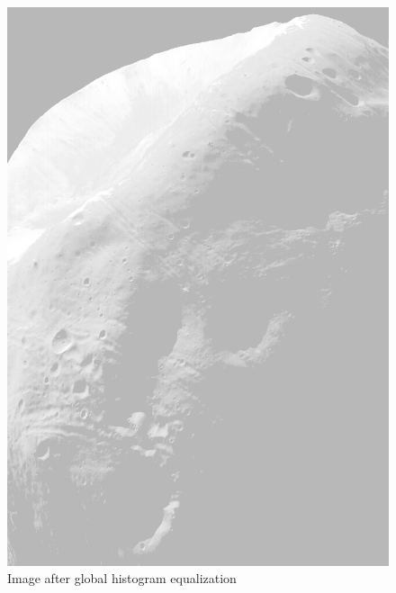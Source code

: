 \documentclass[UTF8]{ctexart}
\begin{document}
\begin{figure}[htbp]
{\begin{minipage}{8cm}
            \includegraphics[scale=0.24]{moon_hist_equal.jpg}
        \end{minipage}
    }
    \caption{Image after global histogram equalization} %
\end{figure}
\end{document}
